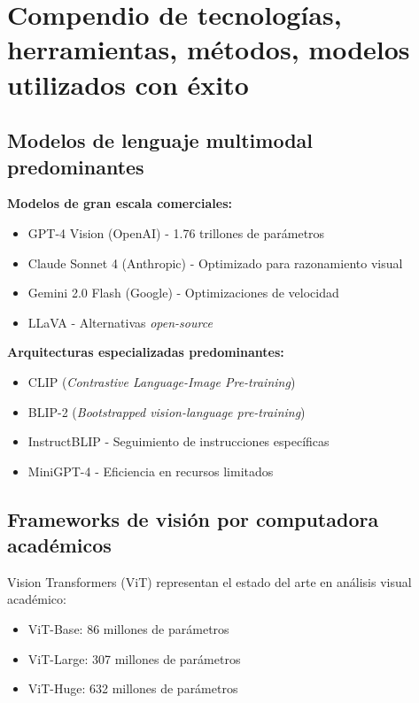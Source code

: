 \section{Compendio de tecnologías, herramientas, métodos, modelos utilizados con éxito}

\subsection{Modelos de lenguaje multimodal predominantes}

\textbf{Modelos de gran escala comerciales:}
\begin{itemize}
    \item GPT-4 Vision (OpenAI) - 1.76 trillones de parámetros
    \item Claude Sonnet 4 (Anthropic) - Optimizado para razonamiento visual
    \item Gemini 2.0 Flash (Google) - Optimizaciones de velocidad
    \item LLaVA - Alternativas \textit{open-source}
\end{itemize}

\textbf{Arquitecturas especializadas predominantes:}
\begin{itemize}
    \item CLIP (\textit{Contrastive Language-Image Pre-training})
    \item BLIP-2 (\textit{Bootstrapped vision-language pre-training})
    \item InstructBLIP - Seguimiento de instrucciones específicas
    \item MiniGPT-4 - Eficiencia en recursos limitados
\end{itemize}

\subsection{Frameworks de visión por computadora académicos}

Vision Transformers (ViT) representan el estado del arte en análisis visual académico:

\begin{itemize}
    \item ViT-Base: 86 millones de parámetros
    \item ViT-Large: 307 millones de parámetros
    \item ViT-Huge: 632 millones de parámetros
\end{itemize}

